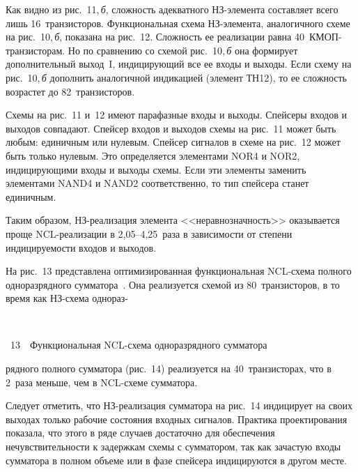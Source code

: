 \begin{multicols}{2}
       Как видно из рис.~11,\,\textit{б}, сложность адекватного НЗ-эле\-мен\-та составляет 
всего лишь 16~транзисторов. Функциональная схема НЗ-элемента, аналогичного схеме на 
рис.~10,\,\textit{б}, показана на рис.~12. Сложность ее реализации равна 
       40~КМОП-тран\-зис\-то\-рам. Но по сравнению со схемой рис.~10,\,\textit{б} она 
формирует дополнительный выход~I, индицирующий все ее входы и выходы. Если схему на 
рис.~10,\,\textit{б} дополнить аналогичной индикацией (элемент ТН12), то ее сложность 
возрастет до 82~транзисторов. 




       
       Схемы на рис.~11 и~12 имеют парафазные входы и выходы. Спейсеры входов и 
выходов совпадают. Спейсер входов и выходов схемы на рис.~11 может быть любым: 
единичным или нулевым. Спейсер сигналов в схеме на рис.~12 может быть только нулевым. 
Это определяется элементами NOR4 и NOR2, индицирующими входы и выходы схемы. Если 
эти элементы заменить элементами NAND4 и NAND2 соответственно, то тип спейсера 
станет единичным.
       
       Таким образом, НЗ-реализация элемента <<неравнозначность>> оказывается проще 
NCL-реа\-ли\-за\-ции в 2,05--4,25~раза в зависимости от степени индицируемости входов и 
выходов.


       
       На рис.~13 представлена оптимизированная функциональная NCL-схе\-ма полного 
одноразрядного сумматора~\cite{68-sok}. Она реализуется схемой из
 80~транзисторов, в то 
время как НЗ-схе\-ма однораз-\linebreak

\noindent
\begin{center}  %
\mbox{%
 \epsfxsize=68.897mm
 }
  \end{center}

  \vspace*{-2pt}

\noindent
{{\figurename~13}\ \ \small{Функциональная NCL-схе\-ма одноразрядного сумматора}}


\noindent
рядного полного сумматора (рис.~14) реализуется на 
40~транзисторах, что в 2~раза меньше, чем в NCL-схе\-ме сумматора. 

 Следует отметить, что НЗ-реа\-ли\-за\-ция сумматора на рис.~14 индицирует на 
своих выходах только рабочие состояния входных сигналов. Практика проектирования 
показала, что этого в ряде случаев достаточно для обеспечения нечувствительности к 
задержкам схемы с сумматором, так как зачастую входы сумматора в полном объеме или в 
фазе спейсера индицируются в другом месте. 


\end{multicols}
